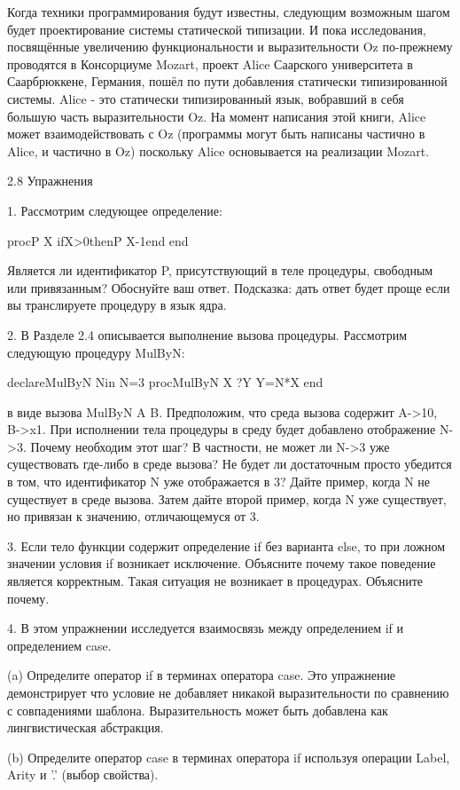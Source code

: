 Когда техники программирования будут известны, следующим возможным шагом будет проектирование системы статической типизации. И пока исследования, посвящённые увеличению функциональности и выразительности Oz по-прежнему проводятся в Консорциуме Mozart, проект Alice Саарского университета в Саарбрюккене, Германия, пошёл по пути добавления статически типизированной системы. Alice - это статически типизированный язык, вобравший в себя большую часть выразительности Oz. На момент написания этой книги, Alice может взаимодействовать с Oz (программы могут быть написаны частично в Alice, и частично в Oz) поскольку Alice основывается на реализации Mozart.

2.8 Упражнения

1. Рассмотрим следующее определение:

proc{P X}
ifX>0then{P X-1}end
end

Является ли идентификатор P, присутствующий в теле процедуры, свободным или привязанным? Обоснуйте ваш ответ. Подсказка: дать ответ будет проще если вы транслируете процедуру в язык ядра.

2. В Разделе 2.4 описывается выполнение вызова процедуры. Рассмотрим следующую процедуру MulByN:

declareMulByN Nin
N=3
proc{MulByN X ?Y}
Y=N*X
end

в виде вызова {MulByN A B}. Предположим, что среда вызова содержит {A->10, B->x1}. При исполнении тела процедуры в среду будет добавлено отображение N->3. Почему необходим этот шаг? В частности, не может ли N->3 уже существовать где-либо в среде вызова? Не будет ли достаточным просто убедится в том, что идентификатор N уже отображается в 3? Дайте пример, когда N не существует в среде вызова. Затем дайте второй пример, когда N уже существует, но привязан к значению, отличающемуся от 3.

3. Если тело функции содержит определение if без варианта else, то при ложном значении условия if возникает исключение. Объясните почему такое поведение является корректным. Такая ситуация не возникает в процедурах. Объясните почему.

4. В этом упражнении исследуется взаимосвязь между определением if и определением case.

(a) Определите оператор if в терминах оператора case. Это упражнение демонстрирует что условие не добавляет никакой выразительности по сравнению с совпадениями шаблона. Выразительность может быть добавлена как лингвистическая абстракция.

(b) Определите оператор case в терминах оператора if используя операции Label, Arity и '.' (выбор свойства).


